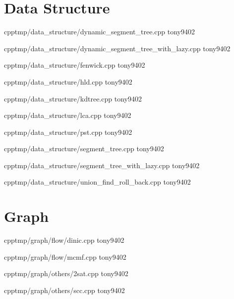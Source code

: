 \section{Data Structure}


{}
{}
{}
{cpp}{tmp/data_structure/dynamic_segment_tree.cpp}
{tony9402}



{}
{}
{}
{cpp}{tmp/data_structure/dynamic_segment_tree_with_lazy.cpp}
{tony9402}



{}
{}
{}
{cpp}{tmp/data_structure/fenwick.cpp}
{tony9402}



{}
{}
{}
{cpp}{tmp/data_structure/hld.cpp}
{tony9402}



{}
{}
{}
{cpp}{tmp/data_structure/kdtree.cpp}
{tony9402}



{}
{}
{}
{cpp}{tmp/data_structure/lca.cpp}
{tony9402}



{}
{}
{}
{cpp}{tmp/data_structure/pst.cpp}
{tony9402}



{}
{}
{}
{cpp}{tmp/data_structure/segment_tree.cpp}
{tony9402}



{}
{}
{}
{cpp}{tmp/data_structure/segment_tree_with_lazy.cpp}
{tony9402}



{}
{}
{}
{cpp}{tmp/data_structure/union_find_roll_back.cpp}
{tony9402}


\section{Graph}


{}
{}
{}
{cpp}{tmp/graph/flow/dinic.cpp}
{tony9402}



{}
{}
{}
{cpp}{tmp/graph/flow/mcmf.cpp}
{tony9402}



{}
{}
{}
{cpp}{tmp/graph/others/2sat.cpp}
{tony9402}



{}
{}
{}
{cpp}{tmp/graph/others/scc.cpp}
{tony9402}



